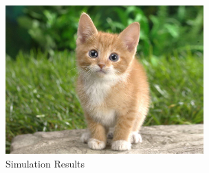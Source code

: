 \begin{figure}
    \centering
    \includegraphics[width=3.0in]{cat.jpg}
    \caption{Simulation Results}
    \label{simulationfigure}
\end{figure}
